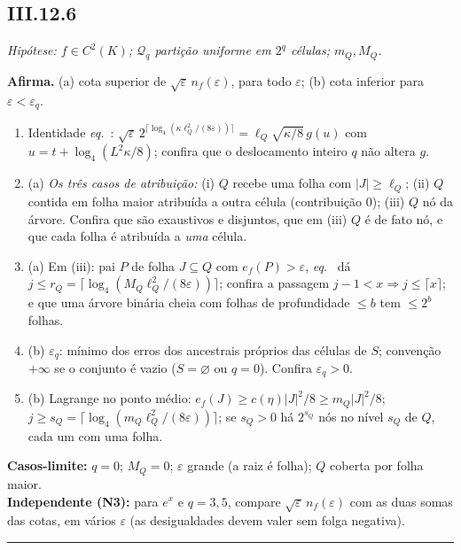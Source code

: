 \documentclass[11pt,a4paper]{article}
\newcommand{\ef}{e_f}
\newcommand{\blk}[1]{\textbf{#1}}
\newenvironment{roteiro}[3]{%
  \subsection*{#1\quad{\normalfont #2}}
  \par\noindent\textit{#3}\par}{\vspace{4pt}\hrule\vspace{2pt}}
\begin{document}
\begin{roteiro}{III.12.6}{Contagem por células (p.~78)}{Hipótese: $f\in C^2(K)$; $\mathcal Q_q$ partição uniforme em $2^q$ células; $m_Q,M_Q$.}
\blk{Afirma.} (a) cota superior de $\sqrt\varepsilon\,n_f(\varepsilon)$, para todo $\varepsilon$; (b) cota inferior para $\varepsilon<\varepsilon_q$.
\begin{enumerate}[leftmargin=1.8em]
\item Identidade \textit{eq.}~: $\sqrt\varepsilon\,2^{\lceil\log_4(\kappa\ell_Q^2/(8\varepsilon))\rceil}=\ell_Q\sqrt{\kappa/8}\,g(u)$ com $u=t+\log_4(L^2\kappa/8)$; confira que o deslocamento inteiro $q$ não altera $g$.
\item (a) \emph{Os três casos de atribuição:} (i) $Q$ recebe uma folha com $|J|\ge\ell_Q$; (ii) $Q$ contida em folha maior atribuída a outra célula (contribuição $0$); (iii) $Q$ nó da árvore. Confira que são exaustivos e disjuntos, que em (iii) $Q$ é de fato nó, e que cada folha é atribuída a \emph{uma} célula.
\item (a) Em (iii): pai $P$ de folha $J\subseteq Q$ com $\ef(P)>\varepsilon$, \textit{eq.}~ dá $j\le r_Q=\lceil\log_4(M_Q\ell_Q^2/(8\varepsilon))\rceil$; confira a passagem $j-1<x\Rightarrow j\le\lceil x\rceil$; e que uma árvore binária cheia com folhas de profundidade $\le b$ tem $\le2^b$ folhas.
\item (b) $\varepsilon_q$: mínimo dos erros dos ancestrais próprios das células de $S$; convenção $+\infty$ se o conjunto é vazio ($S=\varnothing$ ou $q=0$). Confira $\varepsilon_q>0$.
\item (b) Lagrange no ponto médio: $\ef(J)\ge c(\eta)|J|^2/8\ge m_Q|J|^2/8$; $j\ge s_Q=\lceil\log_4(m_Q\ell_Q^2/(8\varepsilon))\rceil$; se $s_Q>0$ há $2^{s_Q}$ nós no nível $s_Q$ de $Q$, cada um com uma folha.
\end{enumerate}
\blk{Casos-limite:} $q=0$; $M_Q=0$; $\varepsilon$ grande (a raiz é folha); $Q$ coberta por folha maior.\\
\blk{Independente (N3):} para $e^x$ e $q=3,5$, compare $\sqrt\varepsilon\,n_f(\varepsilon)$ com as duas somas das cotas, em vários $\varepsilon$ (as desigualdades devem valer sem folga negativa).
\end{roteiro}
\end{document}
